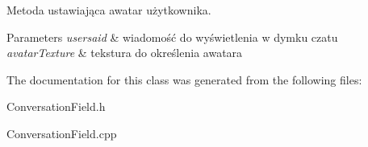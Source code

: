 Metoda ustawiająca awatar użytkownika. 


\begin{DoxyParams}{Parameters}
{\em usersaid} & wiadomość do wyświetlenia w dymku czatu \\
\hline
{\em avatar\+Texture} & tekstura do określenia awatara \\
\hline
\end{DoxyParams}


The documentation for this class was generated from the following files\+:\begin{DoxyCompactItemize}
\item 
Conversation\+Field.\+h\item 
Conversation\+Field.\+cpp\end{DoxyCompactItemize}
